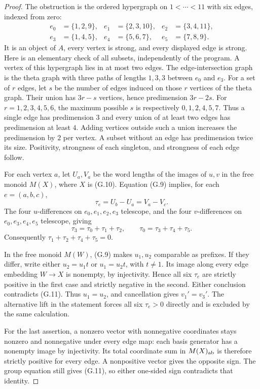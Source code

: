 \begin{proof}
The obstruction is the ordered hypergraph on $1<\cdots<11$
with six edges, indexed from zero:
\[
 \begin{aligned}
 e_0&=\{1,2,9\},& e_1&=\{2,3,10\},& e_2&=\{3,4,11\},\\
 e_3&=\{1,4,5\},& e_4&=\{5,6,7\},& e_5&=\{7,8,9\}.
 \end{aligned}
 \tag{G.10}
\]
It is an object of $A$, every vertex is strong, and every
displayed edge is strong.  Here is an elementary check of all
subsets, independently of the program.  A vertex of this
hypergraph lies in at most two edges.  The edge-intersection
graph is the theta graph with three paths of lengths $1,3,3$
between $e_0$ and $e_3$.  For a set of $r$ edges, let $s$ be
the number of edges induced on those $r$ vertices of the theta
graph.  Their union has $3r-s$ vertices, hence predimension
$3r-2s$.  For $r=1,2,3,4,5,6$, the maximum possible $s$ is
respectively $0,1,2,4,5,7$.  Thus a single edge has
predimension $3$ and every union of at least two edges has
predimension at least $4$.  Adding vertices outside such a
union increases the predimension by $2$ per vertex.  A subset
without an edge has predimension twice its size.  Positivity,
strongness of each singleton, and strongness of each edge
follow.

For each vertex $a$, let $U_a,V_a$ be the word lengths of the
images of $u,v$ in the free monoid $M(X)$, where $X$ is
(G.10).  Equation (G.9) implies, for each $e=(a,b,c)$,
\[
 \tau_e=U_b-U_a=V_a-V_c.
\]
The four $u$-differences on $e_0,e_1,e_2,e_3$ telescope, and
the four $v$-differences on $e_0,e_3,e_4,e_5$ telescope, giving
\[
 \tau_3=\tau_0+\tau_1+\tau_2,\qquad
 \tau_0=\tau_3+\tau_4+\tau_5.
 \tag{G.11}
\]
Consequently $\tau_1+\tau_2+\tau_4+\tau_5=0$.

In the free monoid $M(W)$, (G.9) makes $u_1,u_2$ comparable
as prefixes.  If they differ, write either $u_2=u_1t$ or
$u_1=u_2t$, with $t\ne1$.  Its image along every edge
embedding $W\to X$ is nonempty, by injectivity.  Hence all six
$\tau_e$ are strictly positive in the first case and strictly
negative in the second.  Either conclusion contradicts
(G.11).  Thus $u_1=u_2$, and cancellation gives
$v_1'=v_3'$.  The alternative lift in the statement forces
all six $\tau_e>0$ directly and is excluded by the same
calculation.

For the last assertion, a nonzero vector with nonnegative
coordinates stays nonzero and nonnegative under every edge
map: each basis generator has a nonempty image by injectivity.
Its total coordinate sum in $M(X)_{\mathrm{ab}}$ is therefore strictly
positive for every edge.  A nonpositive vector gives the
opposite sign.  The group equation still gives (G.11), so
either one-sided sign contradicts that identity.


\end{proof}
